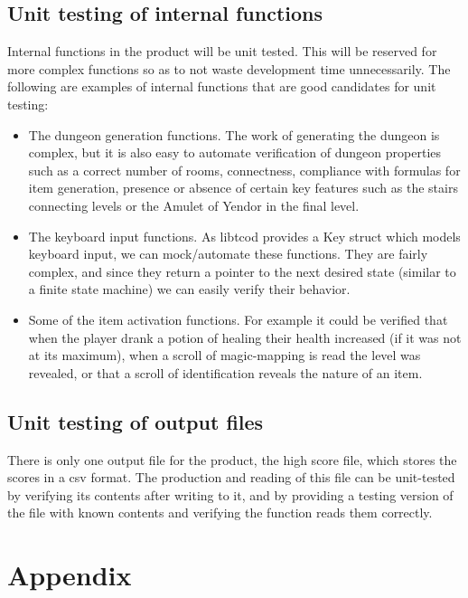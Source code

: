 \documentclass[12pt, titlepage]{article}
\begin{document}
	\subsection{Unit testing of internal functions}
		Internal functions in the product will be unit tested. This will be reserved for more complex functions so as to not waste development time unnecessarily. The following are examples of internal functions that are good candidates for unit testing:
		\begin{itemize}
			\item The dungeon generation functions. The work of generating the dungeon is complex, but it is also easy to automate verification of dungeon properties such as a correct number of rooms, connectness, compliance with formulas for item generation, presence or absence of certain key features such as the stairs connecting levels or the Amulet of Yendor in the final level.
			\item The keyboard input functions. As libtcod provides a Key struct which models keyboard input, we can mock/automate these functions. They are fairly complex, and since they return a pointer to the next desired state (similar to a finite state machine) we can easily verify their behavior.
			\item Some of the item activation functions. For example it could be verified that when the player drank a potion of healing their health increased (if it was not at its maximum), when a scroll of magic-mapping is read the level was revealed, or that a scroll of identification reveals the nature of an item.
		\end{itemize}

	\subsection{Unit testing of output files}
		There is only one output file for the product, the high score file, which stores the scores in a csv format. The production and reading of this file can be unit-tested by verifying its contents after writing to it, and by providing a testing version of the file with known contents and verifying the function reads them correctly.

% 

% 

\newpage
\section{Appendix}
\end{document}
